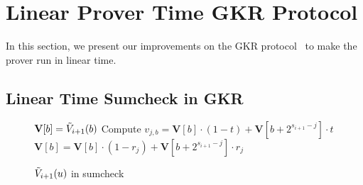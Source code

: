 \section{Linear Prover Time GKR Protocol}
\label{sec::gkrlin}

In this section, we present our improvements on the GKR protocol~\cite{GKR} to make the prover run in linear time. 

\subsection{Linear Time Sumcheck in GKR}


\begin{figure}[ht!]
	\begin{algorithm}[H]
		\caption{$\tilde{V}_{i+1}(u)$ in sumcheck}\label{alg::dynamic}
		\begin{algorithmic}[1]
			\State $\textbf{V}[b] = \tilde{V}_{i+1}(b)$
			\EndFor
			\EndProcedure
			 
			 
					 
					\State\label{alg::dynamic::compute} Compute $v_{j,b} = \textbf{V}[b]\cdot(1-t)+\textbf{V}[b+2^{s_{i+1}-j}]\cdot t$
					\EndFor
				\EndFor
				\State\label{alg::dynamic::update} $\textbf{V}[b]=\textbf{V}[b]\cdot(1-r_j)+\textbf{V}[b+2^{s_{i+1}-j}]\cdot r_j$ 
			\EndFor
			\EndProcedure
		\end{algorithmic}
	\end{algorithm}
\end{figure}

